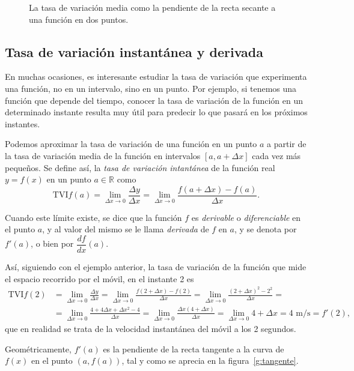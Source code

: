 \begin{figure}[h!]
\begin{center}
\scalebox{1}{}
\caption{La tasa de variación media como la pendiente de la
recta secante a una función en dos puntos.}
\label{g:secante}
\end{center}
\end{figure}


\subsection*{Tasa de variación instantánea y derivada}
En muchas ocasiones, es interesante estudiar la tasa de variación que experimenta una función, no en un intervalo, sino en un punto. Por ejemplo, si tenemos una función que depende del tiempo, conocer la tasa de variación de la función en un determinado instante resulta muy útil para predecir lo que pasará en los próximos instantes.

Podemos aproximar la tasa de variación de una función en un punto $a$ a partir de la tasa de variación media de la función en intervalos $[a,a+\Delta x]$ cada vez más pequeños. Se define así, la \emph{tasa de variación intantánea} de la función real $y=f(x)$ en un punto $a\in \mathbb{R}$ como
\[
\textrm{TVI} f(a)= \lim_{\Delta x\rightarrow 0}\frac{\Delta y}{\Delta x}=\lim_{\Delta x\rightarrow 0}\frac{f(a+\Delta x)-f(a)}{\Delta x}.
\]

Cuando este límite existe, se dice que la función $f$ es \emph{derivable} o \emph{diferenciable} en el punto $a$, y al valor del mismo se le llama \emph{derivada} de $f$ en $a$, y se denota por $f'(a)$, o bien por $\dfrac{df}{dx}(a)$.

Así, siguiendo con el ejemplo anterior, la tasa de variación de la función que mide el espacio recorrido por el móvil, en el instante 2 es
\begin{align*}
\textrm{TVI} f(2) &= \lim_{\Delta x\rightarrow 0}\frac{\Delta y}{\Delta x}=\lim_{\Delta x\rightarrow 0}\frac{f(2+\Delta x)-f(2)}{\Delta x}=\lim_{\Delta x\rightarrow 0}\frac{(2+\Delta x)^2-2^2}{\Delta x}=\\
&=
\lim_{\Delta x\rightarrow 0}\frac{4+4\Delta x+\Delta x^2-4}{\Delta x}=\lim_{\Delta x\rightarrow 0}\frac{\Delta x(4+\Delta x)}{\Delta x}=\lim_{\Delta x\rightarrow 0} 4+\Delta x = 4\textrm{ m/s}=f'(2),
\end{align*}
que en realidad se trata de la velocidad instantánea del móvil a los 2 segundos.

Geométricamente, $f'(a)$ es la pendiente de la recta tangente a la curva de
$f(x)$ en el punto $(a,f(a))$, tal y como se aprecia en la
figura~\ref{g:tangente}.

